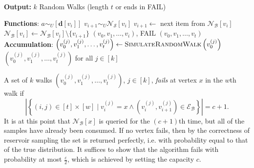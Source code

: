 \documentclass[10]{report}
\newcommand{\algoname}[1]{\textnormal{\textsc{#1}}}
\begin{document}
\begin{algorithm}[htbp]
\begin{flushleft}
        \textbf{Output:} $k$ Random Walks (length $t$ or ends in FAIL)
\end{flushleft}
\begin{flushleft}
\begin{algorithmic}[1]
	\Statex \textbf{Functions}:
				\State $a \sim_U [\mathbf{d}[{v_i}]] $
					\State $v_{i+1} \sim_U \mathcal{N}_\mathcal{S}[v_i]$
				\Else
						\State $v_{i+1} \gets$ next item from $\mathcal{N}_\mathcal{B}[v_i]$
						\State $\mathcal{N}_\mathcal{B}[v_i] \gets \mathcal{N}_\mathcal{B}[v_i] \setminus \{v_{i+1}\}$
					\Else
						\State \Return $(v_0, v_1, \dots, v_i)$, FAIL
					\EndIf
				\EndIf
			\EndFor
			\State \Return $(v_0, v_1, \dots, v_t)$
		\EndFunction
	\Statex \textbf{Accumulation}:
			\State $\left ( v_0^{(j)}, v_1^{(j)}, \dots, v_t^{(j)} \right ) \gets \algoname{SimulateRandomWalk} \left ( v_0^{(j)} \right )$
		\EndParFor
		\State \Return $\left ( v_0^{(j)}, v_1^{(j)}, \dots, v_t^{(j)} \right )$ for all $j \in [k]$
\end{algorithmic}
\end{flushleft}
\end{algorithm}

A set of $k$ walks $\left ( v_0^{(j)}, v_1^{(j)}, \dots, v_t^{(j)} \right )$, $j \in [k]$, \emph{fails} at vertex $x$ in the $w$th walk if 
\begin{equation*}
\left | \left \{ (i,j) \in [t] \times [w] \mid v_i^{(j)} = x 
		\wedge (v_i^{(j)}, v_{i+1}^{(j)}) \in \mathcal{E}_\mathcal{B} \right \} \right | = c + 1.
\end{equation*}
It is at this point that $\mathcal{N}_\mathcal{B}[x]$ is queried for the $(c+1)$th time, but all of the samples have already been consumed.
If no vertex fails, then by the correctness of reservoir sampling the set is returned perfectly, i.e. with probability equal to that of the true distribution.
It suffices to show that the algorithm fails with probability at most $\frac{\varepsilon}{2}$, which is achieved by setting the capacity $c$.
\end{document}
